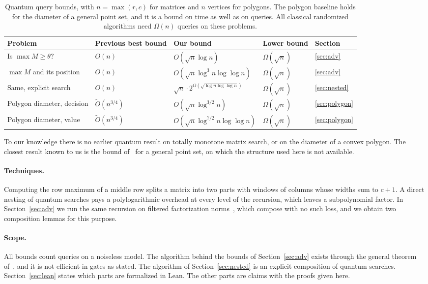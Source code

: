 \documentclass[11pt]{article}
\theoremstyle{definition}
\theoremstyle{remark}
\newcommand{\Ot}{\tilde O}
\begin{document}
\begin{table}[h]
\centering
\small
\renewcommand{\arraystretch}{1.25}
\begin{tabular}{@{}lllll@{}}
\toprule
Problem & Previous best bound & Our bound & Lower bound & Section\\
\midrule
Is $\max M\ge\theta$? & $O(n)$ \cite{AKMSW87} & $O(\sqrt n\log n)$ & $\Omega(\sqrt n)$ & \ref{sec:adv}\\
$\max M$ and its position & $O(n)$ \cite{AKMSW87} & $O(\sqrt n\log^3 n\log\log n)$ & $\Omega(\sqrt n)$ & \ref{sec:adv}\\
Same, explicit search & $O(n)$ \cite{AKMSW87} & $\sqrt n\cdot 2^{O(\sqrt{\log n\log\log n})}$ & $\Omega(\sqrt n)$ & \ref{sec:nested}\\
Polygon diameter, decision & $\Ot(n^{3/4})$ \cite{Zaj23} & $O(\sqrt n\log^{3/2} n)$ & $\Omega(\sqrt n)$ & \ref{sec:polygon}\\
Polygon diameter, value & $\Ot(n^{3/4})$ \cite{Zaj23} & $O(\sqrt n\log^{7/2} n\log\log n)$ & $\Omega(\sqrt n)$ & \ref{sec:polygon}\\
\bottomrule
\end{tabular}
\caption{Quantum query bounds, with $n=\max(r,c)$ for matrices and $n$ vertices for polygons. The polygon baseline \cite{Zaj23} holds for the diameter of a general point set, and it is a bound on time as well as on queries. All classical randomized algorithms need $\Omega(n)$ queries on these problems.}
\label{tab:results}
\end{table}

To our knowledge there is no earlier quantum result on totally monotone matrix search, or on the diameter of a convex polygon. The closest result known to us is the bound of~\cite{Zaj23} for a general point set, on which the structure used here is not available.

\paragraph{Techniques.} Computing the row maximum of a middle row splits a matrix into two parts with windows of columns whose widths sum to $c+1$. A direct nesting of quantum searches pays a polylogarithmic overhead at every level of the recursion, which leaves a subpolynomial factor. In Section~\ref{sec:adv} we run the same recursion on filtered factorization norms~\cite{LMRSS11}, which compose with no such loss, and we obtain two composition lemmas for this purpose.

\paragraph{Scope.} All bounds count queries on a noiseless model. The algorithm behind the bounds of Section~\ref{sec:adv} exists through the general theorem of~\cite{LMRSS11}, and it is not efficient in gates as stated. The algorithm of Section~\ref{sec:nested} is an explicit composition of quantum searches. Section~\ref{sec:lean} states which parts are formalized in Lean. The other parts are claims with the proofs given here.
\end{document}
